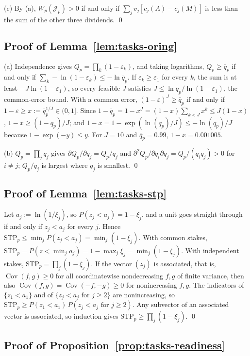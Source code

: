 (c) By (a), $W_p(\mathcal J_p)>0$ if and only if $\sum_jv_j[c_j(A)-c_j(M)]$ is less than the sum of the other three dividends. \qed

\subsection*{Proof of Lemma~\ref{lem:tasks-oring}}

(a) Independence gives $Q_p=\prod_k(1-\varepsilon_k)$, and taking logarithms, $Q_p\ge\bar q_p$ if and only if $\sum_k-\ln(1-\varepsilon_k)\le-\ln\bar q_p$. If $\varepsilon_k\ge\varepsilon_1$ for every $k$, the sum is at least $-J\ln(1-\varepsilon_1)$, so every feasible $J$ satisfies $J\le\ln\bar q_p/\ln(1-\varepsilon_1)$, the common-error bound. With a common error, $(1-\varepsilon)^J\ge\bar q_p$ if and only if $1-\varepsilon\ge x:=\bar q_p^{1/J}\in(0,1]$. Since $1-\bar q_p=1-x^J=(1-x)\sum_{k<J}x^k\le J(1-x)$, $1-x\ge(1-\bar q_p)/J$; and $1-x=1-\exp(\ln(\bar q_p)/J)\le-\ln(\bar q_p)/J$ because $1-\exp(-y)\le y$. For $J=10$ and $\bar q_p=0.99$, $1-x=0.001005$.

(b) $Q_p=\prod_jq_j$ gives $\partial Q_p/\partial q_j=Q_p/q_j$ and $\partial^2Q_p/\partial q_i\partial q_j=Q_p/(q_iq_j)>0$ for $i\ne j$; $Q_p/q_j$ is largest where $q_j$ is smallest. \qed

\subsection*{Proof of Lemma~\ref{lem:tasks-stp}}

Let $a_j:=\ln(1/\xi_j)$, so $P(z_j<a_j)=1-\xi_j$, and a unit goes straight through if and only if $z_j<a_j$ for every $j$. Hence $\mathrm{STP}_p\le\min_jP(z_j<a_j)=\min_j(1-\xi_j)$. With common stakes, $\mathrm{STP}_p=P(z<\min_ja_j)=1-\max_j\xi_j=\min_j(1-\xi_j)$. With independent stakes, $\mathrm{STP}_p=\prod_j(1-\xi_j)$. If the vector $(z_j)$ is associated, that is, $\operatorname{Cov}(f,g)\ge 0$ for all coordinatewise nondecreasing $f,g$ of finite variance, then also $\operatorname{Cov}(f,g)=\operatorname{Cov}(-f,-g)\ge 0$ for nonincreasing $f,g$. The indicators of $\{z_1<a_1\}$ and of $\{z_j<a_j\text{ for }j\ge 2\}$ are nonincreasing, so $\mathrm{STP}_p\ge P(z_1<a_1)\,P(z_j<a_j\text{ for }j\ge 2)$. Any subvector of an associated vector is associated, so induction gives $\mathrm{STP}_p\ge\prod_j(1-\xi_j)$. \qed

\subsection*{Proof of Proposition~\ref{prop:tasks-readiness}}

